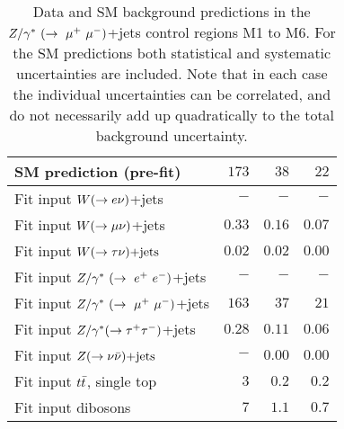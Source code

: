 \begin{table}[!ht]
\begin{center}
\begin{small}
\begin{tabular*}{\textwidth}{@{\extracolsep{\fill}}lrrr}
    \hline

    SM prediction (pre-fit)                 & $173$  & $38$  & $22$  \\                      
    \hline                                                              
                                                                        
    Fit input $W(\rightarrow e \nu)$+jets                  & $-$    & $-$   & $-$   \\
    Fit input $W(\rightarrow \mu \nu)$+jets                  & $0.33$    & $0.16$   & $0.07$   \\
    Fit input $W(\rightarrow \tau \nu)\text{+jets}$                  & $0.02$    & $0.02$   & $0.00$   \\
    Fit input $Z/\gamma^*~(\rightarrow~e^+~e^-)$+jets                  & $-$    & $-$   & $-$   \\
    Fit input $\zmm$+jets                  & $163$  & $37$  & $21$  \\
    Fit input $Z/\gamma^*(\rightarrow \tau^+ \tau^-)$+jets                  & $0.28$    & $0.11$   & $0.06$   \\
    Fit input $Z(\rightarrow \nu \bar{\nu})\text{+jets}$                  & $-$    & $0.00$   & $0.00$   \\
    Fit input $t\bar{t}$, single top    & $3$    & $0.2$   & $0.2$   \\
    Fit input dibosons                & $7$    & $1.1$   & $0.7$   \\

    \hline \hline

    \end{tabular*}
    \end{small}

    \end{center}
    \caption[Data and SM background predictions in the $\zmm$+jets control regions M1 to M6.]
{Data and SM background predictions in the $\zmm$+jets control regions M1 to M6. 
      For the SM predictions both statistical and systematic uncertainties are included.
        Note that in each case the individual 
        uncertainties can be correlated, and do not necessarily add up quadratically to the total background uncertainty.
    }
\label{tab:ControlRegion_CRzmm}
\end{table}
